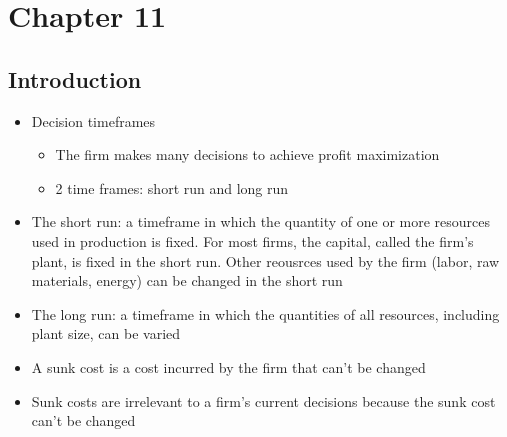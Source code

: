 \documentclass[11pt]{article}
\author{Sudhan Chitgopkar}
\date{\today}
\title{}
\begin{document}
\tableofcontents

\section{Chapter 11}
\label{sec:org10c894e}
\subsection{Introduction}
\label{sec:orgb8ec57c}
\begin{itemize}
\item Decision timeframes
\begin{itemize}
\item The firm makes many decisions to achieve profit maximization
\item 2 time frames: short run and long run
\end{itemize}
\item The short run: a timeframe in which the quantity of one or more resources used in production is fixed. For most firms, the capital, called the firm's plant, is fixed in the short run. Other reousrces used by the firm (labor, raw materials, energy) can be changed in the short run
\item The long run: a timeframe in which the quantities of all resources, including plant size, can be varied
\item A sunk cost is a cost incurred by the firm that can't be changed
\item Sunk costs are irrelevant to a firm's current decisions because the sunk cost can't be changed
\end{itemize}
\end{document}
